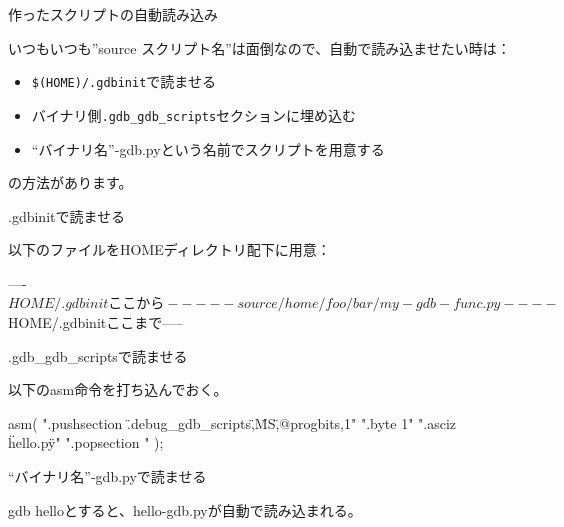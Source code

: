 \begin{frame}[containsverbatim]{作ったスクリプトの自動読み込み}

いつもいつも''source スクリプト名''は面倒なので、自動で読み込ませたい時は：

\begin{itemize}
\item \verb!$(HOME)/.gdbinit!で読ませる
\item バイナリ側\verb!.gdb_gdb_scripts!セクションに埋め込む
\item ``バイナリ名''-gdb.pyという名前でスクリプトを用意する
\end{itemize}

の方法があります。

\end{frame}

\begin{frame}[containsverbatim]{.gdbinitで読ませる}

以下のファイルをHOMEディレクトリ配下に用意：
\begin{commandline}
----${HOME}/.gdbinitここから-----
source /home/foo/bar/my-gdb-func.py
----${HOME}/.gdbinitここまで-----
\end{commandline}
\end{frame}

\begin{frame}[containsverbatim]{.gdb\_gdb\_scriptsで読ませる}

以下のasm命令を打ち込んでおく。
\begin{commandline}
asm(
".pushsection \".debug_gdb_scripts\",\"MS\",@progbits,1\n"
".byte 1\n"
".asciz \"hello.py\"\n"
".popsection \n"
);
\end{commandline}


\end{frame}

\begin{frame}[containsverbatim]{``バイナリ名''-gdb.pyで読ませる}


gdb helloとすると、hello-gdb.pyが自動で読み込まれる。

\end{frame}

